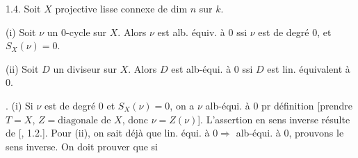  1.4. Soit \(X\) projective lisse connexe de dim \(n\) sur \(k\). 

(i) Soit \(\nu\) un 0-cycle sur \(X\). Alors \(\nu\) est alb. équiv. à 0 ssi \(\nu\) est de degré 0, et \(S_X(\nu)=0\).

(ii) Soit \(D\) un diviseur sur \(X\). Alors \(D\) est alb-équi. à 0 ssi \(D\) est lin. équivalent à 0.


. (i) Si \(\nu\) est de degré 0 et \(S_X(\nu)=0\), on a \(\nu\) alb-équi. à 0 pr définition [prendre \(T=X\), \(Z=\text{diagonale de }X\), donc \(\nu=Z(\nu)\)]. L'assertion en sens inverse résulte de [\hspace{1em}, 1.2.]. Pour (ii), on sait déjà que lin. équi. à \(0\Rightarrow\) alb-équi. à 0, prouvons le sens inverse. On doit prouver que si
